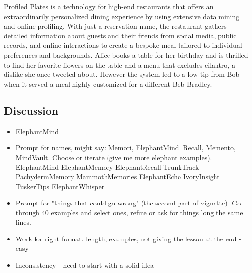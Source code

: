  {Profiled Plates is a technology for high-end restaurants that offers an extraordinarily personalized dining experience by using extensive data mining and online profiling. With just a reservation name, the restaurant gathers detailed information about guests and their friends from social media, public records, and online interactions to create a bespoke meal tailored to individual preferences and backgrounds. Alice books a table for her birthday and is thrilled to find her favorite flowers on the table and a menu that excludes cilantro, a dislike she once tweeted about. However the system led to a low tip from Bob when it served a meal highly customized for a different Bob Bradley.}


\subsection{Discussion}




\begin{itemize}
\item ElephantMind
\item Prompt for names, might say: Memori, ElephantMind, Recall, Memento,  MindVault. Choose or iterate (give me more elephant examples). ElephantMind
ElephantMemory
ElephantRecall
TrunkTrack
PachydermMemory
MammothMemories
ElephantEcho
IvoryInsight
TuskerTips
ElephantWhisper
\item Prompt for "things that could go wrong" (the second part of vignette). Go through 40 examples and select ones, refine or ask for things long the same lines. 
\item Work for right format: length, examples, not giving the lesson at the end - easy
\item Inconsistency - need to start with a solid idea
\end{itemize} 


